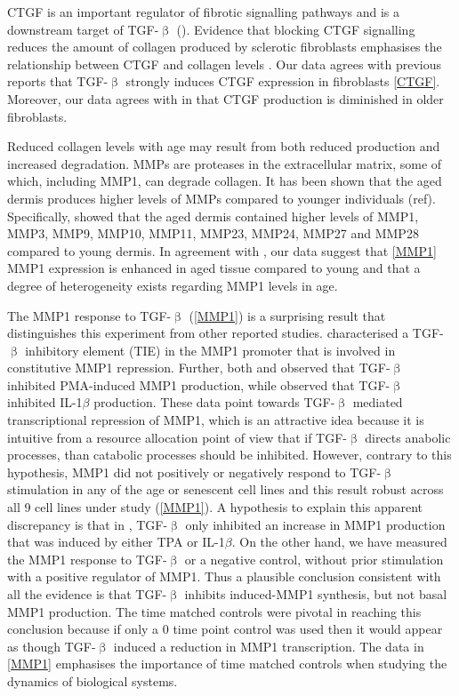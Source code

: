 \documentclass[alpha-refs]{wiley-article}
\newcommand{\tgf}{TGF-$\upbeta$}
\begin{document}
CTGF is an important regulator of fibrotic signalling pathways and is a downstream target of \tgf{} (\cite{Quan2002, Wahab2005, Ponticos2009}). Evidence that blocking CTGF signalling reduces the amount of collagen produced by sclerotic fibroblasts emphasises the relationship between CTGF and collagen levels \citep{Makino2017, Sonnylal2010}. Our data agrees with previous reports that \tgf{} strongly induces CTGF expression in fibroblasts \cref{CTGF}. Moreover, our data agrees with \citep{Quan2010} in that CTGF production is diminished in older fibroblasts.

Reduced collagen levels with age may result from both reduced production and increased degradation. MMPs are proteases in the extracellular matrix, some of which, including MMP1, can degrade collagen. It has been shown that the aged dermis produces higher levels of MMPs compared to younger individuals (ref). Specifically, \citep{Qin2017} showed that the aged dermis contained higher levels of MMP1, MMP3, MMP9, MMP10, MMP11, MMP23, MMP24, MMP27 and MMP28 compared to young dermis. In agreement with \cite{Qin2017}, our data suggest that \cref{MMP1} MMP1 expression is enhanced in aged tissue compared to young and that a degree of heterogeneity exists regarding MMP1 levels in age. 

The MMP1 response to \tgf{} (\cref{MMP1}) is a surprising result that distinguishes this experiment from other reported studies. \cite{White2000} characterised a \tgf{} inhibitory element (TIE) in the MMP1 promoter that is involved in constitutive MMP1 repression. Further, both \cite{White2000} and \cite{Edwards1996} observed that \tgf{} inhibited PMA-induced MMP1 production, while \citep{Yuan2001} observed that \tgf{} inhibited IL-1$\beta$ production. These data point towards \tgf{} mediated transcriptional repression of MMP1, which is an attractive idea because it is intuitive from a resource allocation point of view that if \tgf{} directs anabolic processes, than catabolic processes should be inhibited. However, contrary to this hypothesis, MMP1 did not positively or negatively respond to \tgf{} stimulation in any of the age or senescent cell lines and this result robust across all 9 cell lines under study (\cref{MMP1}). A hypothesis to explain this apparent discrepancy is that in \citep{White2000, Edwards1996, Yuan2001}, \tgf{} only inhibited an increase in MMP1 production that was induced by either TPA or IL-1$\beta$. On the other hand, we have measured the MMP1 response to \tgf{} or a negative control, without prior stimulation with a positive regulator of MMP1. Thus a plausible conclusion consistent with all the evidence is that \tgf{} inhibits induced-MMP1 synthesis, but not basal MMP1 production. The time matched controls were pivotal in reaching this conclusion because if only a 0 time point control was used then it would appear as though \tgf{} induced a reduction in MMP1 transcription. The data in \cref{MMP1} emphasises the importance of time matched controls when studying the dynamics of biological systems.
\end{document}
